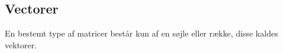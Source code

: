 \subsection{Vectorer}
En bestemt type af matricer består kun af en søjle eller række, disse kaldes vektorer. 
